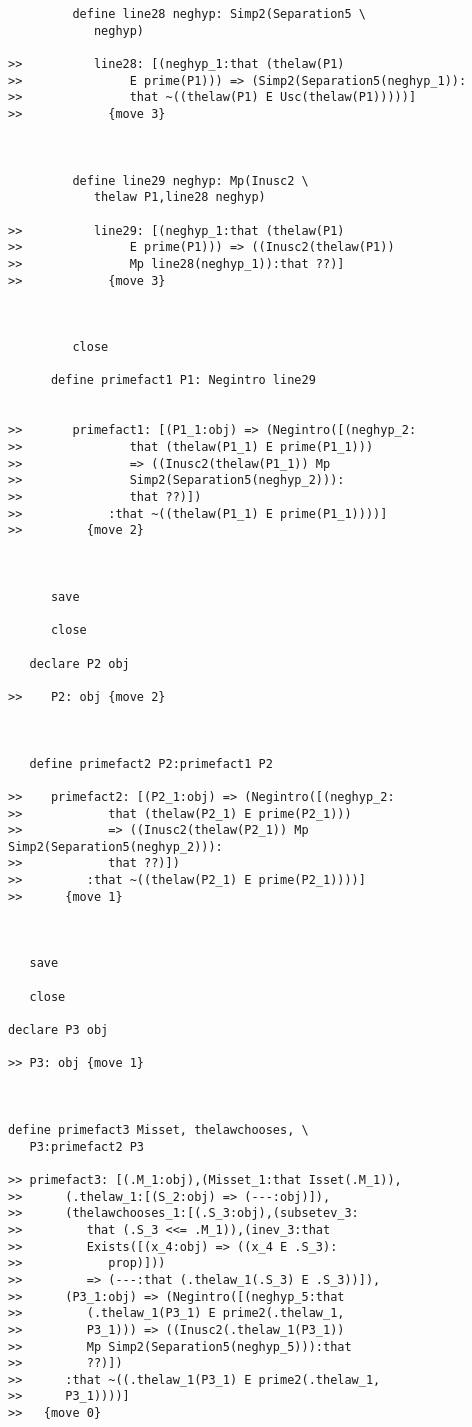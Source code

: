 \documentclass[12pt]{article}
\begin{document}
\begin{verbatim}
         define line28 neghyp: Simp2(Separation5 \
            neghyp)

>>          line28: [(neghyp_1:that (thelaw(P1)
>>               E prime(P1))) => (Simp2(Separation5(neghyp_1)):
>>               that ~((thelaw(P1) E Usc(thelaw(P1)))))]
>>            {move 3}



         define line29 neghyp: Mp(Inusc2 \
            thelaw P1,line28 neghyp)

>>          line29: [(neghyp_1:that (thelaw(P1)
>>               E prime(P1))) => ((Inusc2(thelaw(P1))
>>               Mp line28(neghyp_1)):that ??)]
>>            {move 3}



         close

      define primefact1 P1: Negintro line29


>>       primefact1: [(P1_1:obj) => (Negintro([(neghyp_2:
>>               that (thelaw(P1_1) E prime(P1_1)))
>>               => ((Inusc2(thelaw(P1_1)) Mp
>>               Simp2(Separation5(neghyp_2))):
>>               that ??)])
>>            :that ~((thelaw(P1_1) E prime(P1_1))))]
>>         {move 2}



      save

      close

   declare P2 obj

>>    P2: obj {move 2}



   define primefact2 P2:primefact1 P2

>>    primefact2: [(P2_1:obj) => (Negintro([(neghyp_2:
>>            that (thelaw(P2_1) E prime(P2_1)))
>>            => ((Inusc2(thelaw(P2_1)) Mp Simp2(Separation5(neghyp_2))):
>>            that ??)])
>>         :that ~((thelaw(P2_1) E prime(P2_1))))]
>>      {move 1}



   save

   close

declare P3 obj

>> P3: obj {move 1}



define primefact3 Misset, thelawchooses, \
   P3:primefact2 P3

>> primefact3: [(.M_1:obj),(Misset_1:that Isset(.M_1)),
>>      (.thelaw_1:[(S_2:obj) => (---:obj)]),
>>      (thelawchooses_1:[(.S_3:obj),(subsetev_3:
>>         that (.S_3 <<= .M_1)),(inev_3:that
>>         Exists([(x_4:obj) => ((x_4 E .S_3):
>>            prop)]))
>>         => (---:that (.thelaw_1(.S_3) E .S_3))]),
>>      (P3_1:obj) => (Negintro([(neghyp_5:that
>>         (.thelaw_1(P3_1) E prime2(.thelaw_1,
>>         P3_1))) => ((Inusc2(.thelaw_1(P3_1))
>>         Mp Simp2(Separation5(neghyp_5))):that
>>         ??)])
>>      :that ~((.thelaw_1(P3_1) E prime2(.thelaw_1,
>>      P3_1))))]
>>   {move 0}




\end{verbatim}
\end{document}
